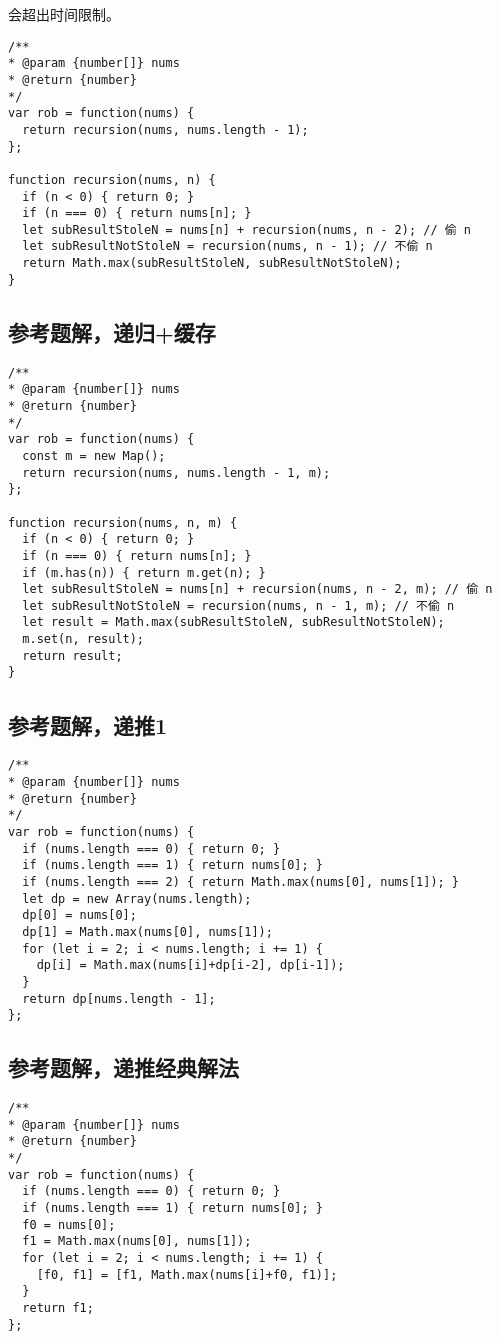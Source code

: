 会超出时间限制。

\begin{verbatim}
/**
* @param {number[]} nums
* @return {number}
*/
var rob = function(nums) {
  return recursion(nums, nums.length - 1);
};

function recursion(nums, n) {
  if (n < 0) { return 0; }
  if (n === 0) { return nums[n]; }
  let subResultStoleN = nums[n] + recursion(nums, n - 2); // 偷 n
  let subResultNotStoleN = recursion(nums, n - 1); // 不偷 n
  return Math.max(subResultStoleN, subResultNotStoleN);
}
\end{verbatim}

\subsection{参考题解，递归+缓存}

\begin{verbatim}
/**
* @param {number[]} nums
* @return {number}
*/
var rob = function(nums) {
  const m = new Map();
  return recursion(nums, nums.length - 1, m);
};

function recursion(nums, n, m) {
  if (n < 0) { return 0; }
  if (n === 0) { return nums[n]; }
  if (m.has(n)) { return m.get(n); }
  let subResultStoleN = nums[n] + recursion(nums, n - 2, m); // 偷 n
  let subResultNotStoleN = recursion(nums, n - 1, m); // 不偷 n
  let result = Math.max(subResultStoleN, subResultNotStoleN);
  m.set(n, result);
  return result;
}
\end{verbatim}

\subsection{参考题解，递推1}

\begin{verbatim}
/**
* @param {number[]} nums
* @return {number}
*/
var rob = function(nums) {
  if (nums.length === 0) { return 0; }
  if (nums.length === 1) { return nums[0]; }
  if (nums.length === 2) { return Math.max(nums[0], nums[1]); }
  let dp = new Array(nums.length);
  dp[0] = nums[0];
  dp[1] = Math.max(nums[0], nums[1]);
  for (let i = 2; i < nums.length; i += 1) {
    dp[i] = Math.max(nums[i]+dp[i-2], dp[i-1]);
  }
  return dp[nums.length - 1];
};
\end{verbatim}

\subsection{参考题解，递推经典解法}

\begin{verbatim}
/**
* @param {number[]} nums
* @return {number}
*/
var rob = function(nums) {
  if (nums.length === 0) { return 0; }
  if (nums.length === 1) { return nums[0]; }
  f0 = nums[0];
  f1 = Math.max(nums[0], nums[1]);
  for (let i = 2; i < nums.length; i += 1) {
    [f0, f1] = [f1, Math.max(nums[i]+f0, f1)];
  }
  return f1;
};
\end{verbatim}
